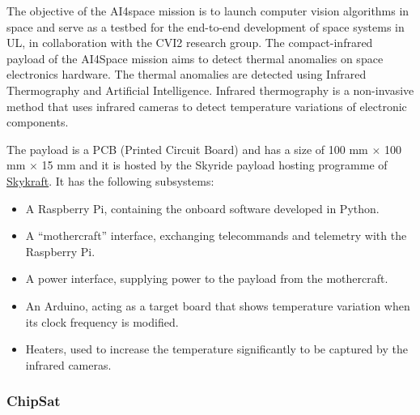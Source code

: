 \documentclass[]{iac}
\def\todo#1{}
\begin{document}
The objective of the AI4space mission is to launch computer vision algorithms in space and serve as a testbed for the end-to-end development of space systems in UL, in collaboration with the CVI2 research group. %
The compact-infrared payload of the AI4Space mission aims to detect thermal anomalies on space electronics hardware. The thermal anomalies are detected using Infrared Thermography and Artificial Intelligence. Infrared thermography is a non-invasive method that uses infrared cameras to detect temperature variations of electronic components.

\todo{Please check if the attributions (spasys, UL, CVI2) are correct.}


The payload is a PCB (Printed Circuit Board) and has a size of 100 mm \(\times\) 100 mm \(\times\) 15 mm and it is hosted by the Skyride payload hosting programme of \href{https://www.skykraft.com.au/}{Skykraft}. It has the following subsystems:

\begin{itemize}[itemsep=0pt]
    \item A Raspberry Pi, containing the onboard software developed in Python.
    \item A ``mothercraft'' interface, exchanging telecommands and telemetry with the Raspberry Pi.
    \item A power interface, supplying power to the payload from the mothercraft.
    \item An Arduino, acting as a target board that shows temperature variation when its clock frequency is modified.
    \item Heaters, used to increase the temperature significantly to be captured by the infrared cameras.
\end{itemize}




\subsubsection{ChipSat}
\end{document}
